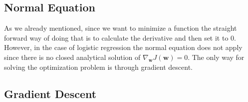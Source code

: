 \subsection{Normal Equation}

As we already mentioned, since we want to minimize a function the straight forward way of doing that is to calculate
the derivative and then set it to 0. However, in the case of logistic regression the normal equation does not apply
since there is no closed analytical solution of $\nabla_{\boldsymbol{w}} J (\boldsymbol{w})=0$. The only way for
solving the optimization problem is through gradient descent.

\subsection{Gradient Descent}

